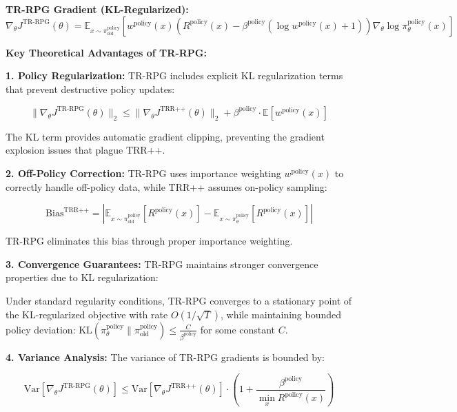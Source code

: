 \documentclass[10pt,a4paper]{article}
\begin{document}
\textbf{TR-RPG Gradient (KL-Regularized):}
\begin{equation}
\nabla_\theta J^{\text{TR-RPG}}(\theta) = \mathbb{E}_{x \sim \pi_{\text{old}}^{\text{policy}}}\left[w^{\text{policy}}(x) \left(R^{\text{policy}}(x) - \beta^{\text{policy}}(\log w^{\text{policy}}(x) + 1)\right) \nabla_\theta \log \pi_\theta^{\text{policy}}(x)\right]
\end{equation}

\textbf{Key Theoretical Advantages of TR-RPG:}

\textbf{1. Policy Regularization:} TR-RPG includes explicit KL regularization terms that prevent destructive policy updates:

\begin{equation}
\|\nabla_\theta J^{\text{TR-RPG}}(\theta)\|_2 \leq \|\nabla_\theta J^{\text{TRR++}}(\theta)\|_2 + \beta^{\text{policy}} \cdot \mathbb{E}[w^{\text{policy}}(x)]
\end{equation}

The KL term provides automatic gradient clipping, preventing the gradient explosion issues that plague TRR++.

\textbf{2. Off-Policy Correction:} TR-RPG uses importance weighting $w^{\text{policy}}(x)$ to correctly handle off-policy data, while TRR++ assumes on-policy sampling:

\begin{equation}
\text{Bias}^{\text{TRR++}} = \left|\mathbb{E}_{x \sim \pi_{\text{old}}^{\text{policy}}}[R^{\text{policy}}(x)] - \mathbb{E}_{x \sim \pi_\theta^{\text{policy}}}[R^{\text{policy}}(x)]\right|
\end{equation}

TR-RPG eliminates this bias through proper importance weighting.

\textbf{3. Convergence Guarantees:} TR-RPG maintains stronger convergence properties due to KL regularization:

\begin{theorem}
Under standard regularity conditions, TR-RPG converges to a stationary point of the KL-regularized objective with rate $O(1/\sqrt{T})$, while maintaining bounded policy deviation: $\text{KL}(\pi_\theta^{\text{policy}} \| \pi_{\text{old}}^{\text{policy}}) \leq \frac{C}{\beta^{\text{policy}}}$ for some constant $C$.
\end{theorem}

\textbf{4. Variance Analysis:} The variance of TR-RPG gradients is bounded by:

\begin{equation}
\text{Var}[\nabla_\theta J^{\text{TR-RPG}}(\theta)] \leq \text{Var}[\nabla_\theta J^{\text{TRR++}}(\theta)] \cdot \left(1 + \frac{\beta^{\text{policy}}}{\min_x R^{\text{policy}}(x)}\right)
\end{equation}
\end{document}
